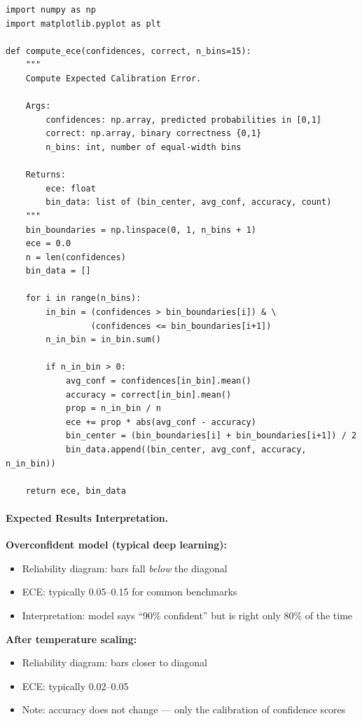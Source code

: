 \begin{lstlisting}[style=python, caption={Expected Calibration Error computation}]
import numpy as np
import matplotlib.pyplot as plt

def compute_ece(confidences, correct, n_bins=15):
    """
    Compute Expected Calibration Error.

    Args:
        confidences: np.array, predicted probabilities in [0,1]
        correct: np.array, binary correctness {0,1}
        n_bins: int, number of equal-width bins

    Returns:
        ece: float
        bin_data: list of (bin_center, avg_conf, accuracy, count)
    """
    bin_boundaries = np.linspace(0, 1, n_bins + 1)
    ece = 0.0
    n = len(confidences)
    bin_data = []

    for i in range(n_bins):
        in_bin = (confidences > bin_boundaries[i]) & \
                 (confidences <= bin_boundaries[i+1])
        n_in_bin = in_bin.sum()

        if n_in_bin > 0:
            avg_conf = confidences[in_bin].mean()
            accuracy = correct[in_bin].mean()
            prop = n_in_bin / n
            ece += prop * abs(avg_conf - accuracy)
            bin_center = (bin_boundaries[i] + bin_boundaries[i+1]) / 2
            bin_data.append((bin_center, avg_conf, accuracy, n_in_bin))

    return ece, bin_data
\end{lstlisting}

\paragraph{Expected Results Interpretation.}

\textbf{Overconfident model (typical deep learning):}
\begin{itemize}
    \item Reliability diagram: bars fall \emph{below} the diagonal
    \item ECE: typically 0.05--0.15 for common benchmarks
    \item Interpretation: model says ``90\% confident'' but is right only 80\% of the time
\end{itemize}

\textbf{After temperature scaling:}
\begin{itemize}
    \item Reliability diagram: bars closer to diagonal
    \item ECE: typically 0.02--0.05
    \item Note: accuracy does not change --- only the calibration of confidence scores
\end{itemize}


